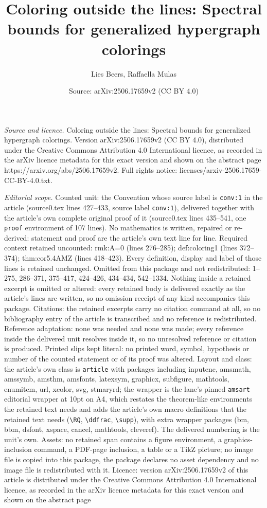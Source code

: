 \documentclass[10pt,a4paper]{amsart}
\title[Coloring outside the lines: Spectral bounds for generalized ]{Coloring outside the lines: Spectral bounds for generalized hypergraph colorings}
\author{Lies Beers, Raffaella Mulas}
\date{Source: arXiv:2506.17659v2 (CC BY 4.0)}
\begin{document}
\maketitle

\noindent\emph{Source and licence.} Coloring outside the lines: Spectral bounds for generalized hypergraph colorings. Version arXiv:2506.17659v2 (CC BY 4.0), distributed under the Creative Commons Attribution 4.0 International licence, as recorded in the arXiv licence metadata for this exact version and shown on the abstract page https://arxiv.org/abs/2506.17659v2. Full rights notice: licenses/arxiv-2506.17659-CC-BY-4.0.txt.\par\smallskip

\noindent\textit{Editorial scope.} Counted unit: the Convention whose source label is \texttt{conv:1} in the article (source0.tex lines 427--433, source label \texttt{conv:1}), delivered together with the article's own complete original proof of it (source0.tex lines 435--541, one \texttt{proof} environment of 107 lines). No mathematics is written, repaired or re-derived: statement and proof are the article's own text line for line. Required context retained uncounted: rmk:A=0 (lines 276--285); def:coloring1 (lines 372--374); thm:cor5.4AMZ (lines 418--423). Every definition, display and label of those lines is retained unchanged. Omitted from this package and not redistributed: 1--275, 286--371, 375--417, 424--426, 434--434, 542--1334. Nothing inside a retained excerpt is omitted or altered: every retained body is delivered exactly as the article's lines are written, so no omission receipt of any kind accompanies this package. Citations: the retained excerpts carry no citation command at all, so no bibliography entry of the article is transcribed and no reference is redistributed. Reference adaptation: none was needed and none was made; every reference inside the delivered unit resolves inside it, so no unresolved reference or citation is produced. Printed slips kept literal: no printed word, symbol, hypothesis or number of the counted statement or of its proof was altered. Layout and class: the article's own class is \texttt{article} with packages including inputenc, amsmath, amssymb, amsthm, amsfonts, latexsym, graphicx, subfigure, mathtools, enumitem, url, xcolor, svg, stmaryrd; the wrapper is the lane's pinned \texttt{amsart} editorial wrapper at 10pt on A4, which restates the theorem-like environments the retained text needs and adds the article's own macro definitions that the retained text needs (\texttt{\textbackslash RQ}, \texttt{\textbackslash ddfrac}, \texttt{\textbackslash supp}), with extra wrapper packages (bm, bbm, dsfont, xspace, cancel, mathtools, cleveref). The delivered numbering is the unit's own. Assets: no retained span contains a figure environment, a graphics-inclusion command, a PDF-page inclusion, a table or a TikZ picture; no image file is copied into this package, the package declares no asset dependency and no image file is redistributed with it. Licence: version arXiv:2506.17659v2 of this article is distributed under the Creative Commons Attribution 4.0 International licence, as recorded in the arXiv licence metadata for this exact version and shown on the abstract page 
\end{document}
